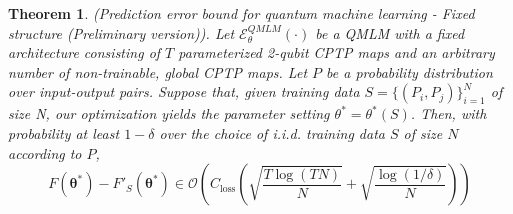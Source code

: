 \documentclass[%
 reprint,
 amsmath,amssymb,
 aps,
]{revtex4-2}
\newcommand{\E}{\mathcal{E}}
\newtheorem{theorem}{Theorem}[section]
\begin{document}
\begin{theorem}
    (Prediction error bound for quantum machine learning - Fixed structure (Preliminary version)). Let $\E^{QMLM}_\theta(\cdot)$ be a QMLM with a fixed architecture consisting of $T$ parameterized 2-qubit CPTP maps and an arbitrary number of non-trainable, global CPTP maps. Let $P$ be a probability distribution over input-output pairs. Suppose that, given training data $S = \{(P_i, P_j)\}_{i=1}^N$ of size N, our optimization yields the parameter setting $\theta^* = \theta^*(S)$. Then, with probability at least $ 1-\delta$ over the choice of i.i.d. training data $S$ of size $N$ according to $P$,
    \begin{equation}
        F\left(\boldsymbol{\theta}^*\right)-F'_S\left(\boldsymbol{\theta}^*\right) \in \mathcal{O}\left(C_{\operatorname{loss}}\left(\sqrt{\frac{T \log (T N)}{N}}+\sqrt{\frac{\log (1 / \delta)}{N}}\right)\right)
    \end{equation}
\end{theorem}
\end{document}
